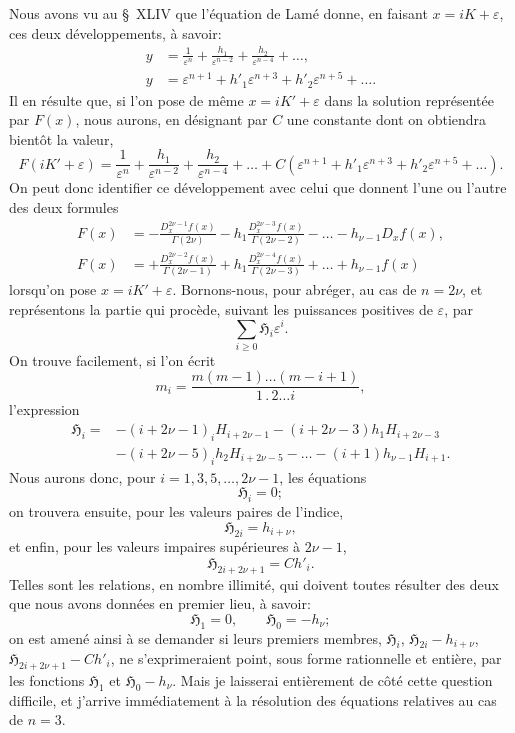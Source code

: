 \documentclass[11pt,leqno,oneside,letterpaper]{book}[2005/09/16]
\newcommand{\cntrdot}{\mathbin{.}}
\begin{document}
Nous avons vu au \S~XLIV %
que l'\'equation de Lam\'e donne, en faisant
$x=iK+\varepsilon$, ces deux d\'eveloppements, \`a savoir:
\begin{align*}
y &= \frac{1}{\varepsilon^n} + \frac{h_1}{\varepsilon^{n-2}} +
  \frac{h_2}{\varepsilon^{n-4}} + \ldots, \\
y &= \varepsilon^{n+1} + h'_1\varepsilon^{n+3} +
  h'_2\varepsilon^{n+5} + \ldots.
\end{align*}
Il en r\'esulte que, si l'on pose de m\^eme $x=iK'+\varepsilon$ dans la solution repr\'esent\'ee
par $F(x)$, nous aurons, en d\'esignant par $C$ une constante dont on
obtiendra bient\^ot la valeur,
\[
  F(iK'+\varepsilon) = \frac{1}{\varepsilon^n} +
    \frac{h_1}{\varepsilon^{n-2}} +
    \frac{h_2}{\varepsilon^{n-4}} + \ldots
  + C\left(\varepsilon^{n+1} + h'_1\varepsilon^{n+3} + h'_2\varepsilon^{n+5} + \ldots\right).
\]
On peut donc identifier ce d\'eveloppement avec celui que donnent l'une ou
l'autre des deux formules
\begin{align*}
  F(x) &=   -\frac{D_x^{2\nu-1}f(x)}{\Gamma(2\nu)} -
          h_1\frac{D_x^{2\nu-3}f(x)}{\Gamma(2\nu-2)} - \ldots -
          h_{\nu-1}D_xf(x), \\
  F(x) &=   +\frac{D_x^{2\nu-2}f(x)}{\Gamma(2\nu-1)} +
          h_1\frac{D_x^{2\nu-4}f(x)}{\Gamma(2\nu-3)} + \ldots +
          h_{\nu-1}f(x)
\end{align*}
lorsqu'on pose $x=iK'+\varepsilon$. Bornons-nous, pour abr\'eger, au cas de $n=2\nu$,
et repr\'esentons la partie qui proc\`ede, suivant les puissances positives de $\varepsilon$,
par
\[
\sum_{i\geq 0} \mathfrak{H}_i\varepsilon^i.
\]
On trouve facilement, si l'on \'ecrit
\[
m_i = \frac{m(m-1)\ldots(m-i+1)}{1\cntrdot 2\ldots i},
\]
l'expression\label{page125}
\begin{align*}
  \mathfrak{H}_i =& -(i+2\nu-1)_i H_{i+2\nu-1} - (i+2\nu-3)h_1H_{i+2\nu-3} \\
  & - (i+2\nu-5)_i h_2H_{i+2\nu-5} - \ldots - (i+1)h_{\nu-1}H_{i+1}.
\end{align*}
Nous aurons donc, pour $i = 1, 3, 5, \ldots, 2\nu-1$, les \'equations
\[
\mathfrak{H}_i = 0;
\]
on trouvera ensuite, pour les valeurs paires de l'indice,
\[
\mathfrak{H}_{2i} = h_{i+\nu},
\]
et enfin, pour les valeurs impaires sup\'erieures \`a $2\nu - 1$,
\[
\mathfrak{H}_{2i+2\nu+1} = Ch'_i.
\]
Telles sont les relations, en nombre illimit\'e, qui doivent toutes r\'esulter
des deux que nous avons donn\'ees en premier lieu, \`a savoir:
\[
\mathfrak{H}_1 = 0, \qquad \mathfrak{H}_0 = -h_{\nu};
\]
on est amen\'e ainsi \`a se demander si leurs premiers membres, $\mathfrak{H}_i$, $\mathfrak{H}_{2i} - h_{i+\nu}$,
$\mathfrak{H}_{2i+2\nu+1} - Ch'_i$, ne s'exprimeraient point, sous forme rationnelle et enti\`ere,
par les fonctions $\mathfrak{H}_1$ et $\mathfrak{H}_0-h_{\nu}$. Mais je laisserai enti\`erement de c\^ot\'e cette
question difficile, et j'arrive imm\'ediatement \`a la r\'esolution des \'equations
relatives au cas de $n = 3$.
\end{document}
